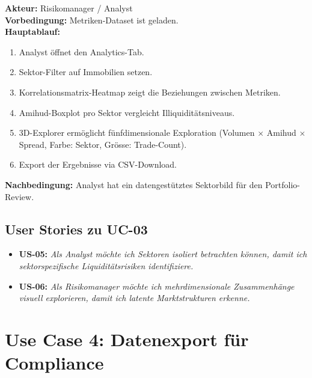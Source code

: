 \documentclass[12pt, a4paper, oneside]{report}
\begin{document}
\begin{usecasebox}
\textbf{Akteur:} Risikomanager / Analyst\\[4pt]
\textbf{Vorbedingung:} Metriken-Dataset ist geladen.\\[4pt]
\textbf{Hauptablauf:}
\begin{enumerate}
  \item Analyst \"offnet den Analytics-Tab.
  \item Sektor-Filter auf \glqq Immobilien\grqq{} setzen.
  \item Korrelationsmatrix-Heatmap zeigt die Beziehungen zwischen Metriken.
  \item Amihud-Boxplot pro Sektor vergleicht Illiquidit\"atsniveaus.
  \item 3D-Explorer erm\"oglicht f\"unfdimensionale Exploration (Volumen $\times$ Amihud $\times$ Spread, Farbe: Sektor, Gr\"osse: Trade-Count).
  \item Export der Ergebnisse via CSV-Download.
\end{enumerate}
\textbf{Nachbedingung:} Analyst hat ein datengest\"utztes Sektorbild f\"ur den Portfolio-Review.
\end{usecasebox}

\subsection{User Stories zu UC-03}

\begin{itemize}
  \item \textbf{US-05:} \textit{Als Analyst m\"ochte ich Sektoren isoliert betrachten k\"onnen, damit ich sektorspezifische Liquidit\"atsrisiken identifiziere.}
  \item \textbf{US-06:} \textit{Als Risikomanager m\"ochte ich mehrdimensionale Zusammenh\"ange visuell explorieren, damit ich latente Marktstrukturen erkenne.}
\end{itemize}

\section{Use Case 4: Datenexport f\"ur Compliance}
\end{document}
